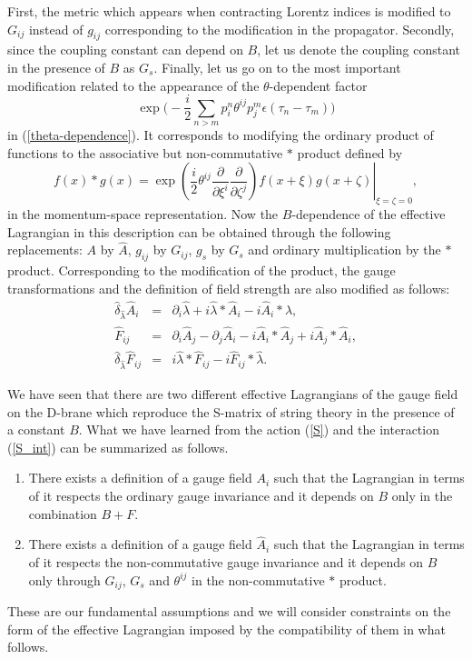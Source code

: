 \documentclass[a4paper,12pt]{article}
\begin{document}
First, the metric which appears when contracting
Lorentz indices is modified to $G_{ij}$ instead of $g_{ij}$
corresponding to the modification in the propagator.
Secondly, since the coupling constant can depend
on $B$, let us denote the coupling constant
in the presence of $B$ as $G_s$.
Finally, let us go on to the most important modification
related to the appearance of the $\theta$-dependent factor
\begin{equation}
\exp \Big(
-\frac{i}{2} \sum_{n > m} p^n_i \theta^{ij} p^m_j
\epsilon (\tau_n - \tau_m)
\Big)
\end{equation}
in (\ref{theta-dependence}).
It corresponds to modifying the ordinary product of functions
to the associative but non-commutative $\ast$ product defined by
\begin{equation}
f(x) \ast g(x) = \exp \left. \left(
\frac{i}{2} \theta^{ij}
\frac{\partial}{\partial \xi^i}
\frac{\partial}{\partial \zeta^j} \right)
f(x + \xi) g(x + \zeta) \right|_{\xi=\zeta=0},
\end{equation}
in the momentum-space representation.
Now the $B$-dependence of the effective Lagrangian
in this description can be obtained
through the following replacements:
$A$ by $\hat{A}$, $g_{ij}$ by $G_{ij}$, $g_s$ by $G_s$
and ordinary multiplication by the $\ast$ product.
Corresponding to the modification of the product,
the gauge transformations and the definition of field strength
are also modified as follows:
\begin{eqnarray}
\hat{\delta}_{\hat{\lambda}} \hat{A}_i
&=& \partial_i \hat{\lambda} + i \hat{\lambda} \ast \hat{A}_i
- i \hat{A}_i \ast \hat{\lambda},
\label{non-commutative-transformation} \\
\hat{F}_{ij} &=& \partial_i \hat{A}_j - \partial_j \hat{A}_i
-i \hat{A}_i \ast \hat{A}_j +i \hat{A}_j \ast \hat{A}_i,
\label{definition-F-hat} \\
\hat{\delta}_{\hat{\lambda}} \hat{F}_{ij}
&=& i \hat{\lambda} \ast \hat{F}_{ij}
- i \hat{F}_{ij} \ast \hat{\lambda}.
\end{eqnarray}

We have seen that there are two different
effective Lagrangians of the gauge field on the D-brane
which reproduce the S-matrix of string theory
in the presence of a constant $B$.
What we have learned from the action (\ref{S})
and the interaction (\ref{S_int})
can be summarized as follows.
\begin{enumerate}
\item
There exists a definition of a gauge field $A_i$ such that
the Lagrangian in terms of it respects
the ordinary gauge invariance
and it depends on $B$ only in the combination $B+F$.
\item
There exists a definition of a gauge field $\hat{A}_i$ such that
the Lagrangian in terms of it respects
the non-commutative gauge invariance
and it depends on $B$ only through
$G_{ij}$, $G_s$ and $\theta^{ij}$
in the non-commutative $\ast$ product.
\begin{equation}
\label{two}
\end{equation}
\end{enumerate}
These are our fundamental assumptions
and we will consider constraints on the form of
the effective Lagrangian imposed by the compatibility of
them in what follows.
\end{document}
